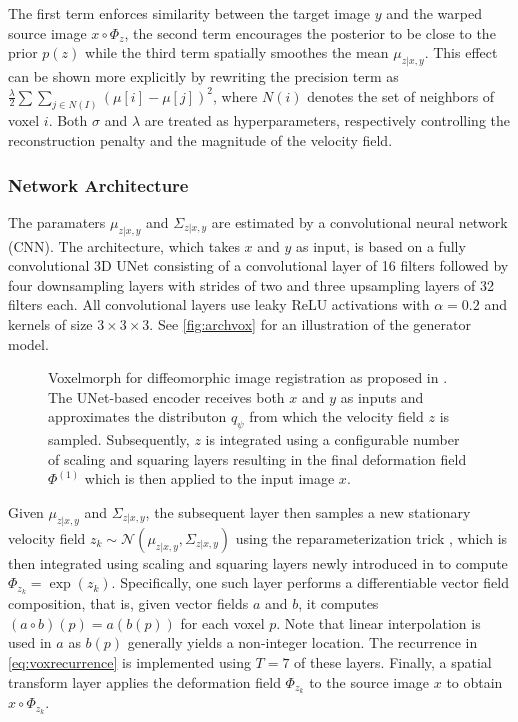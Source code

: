 The first term enforces similarity between the target image $y$ and the warped source image $x \circ \Phi_z$, the second term encourages the posterior to be close to the prior $p(z)$ while the third term spatially smoothes the mean $\mu_{z | x, y}$. This effect can be shown more explicitly by rewriting the precision term as $ { \frac{\lambda}{2} \sum \sum_{j \in N(I)} ( \mu[i] - \mu[j])^{2} } $, where $N(i)$ denotes the set of neighbors of voxel $i$. Both $\sigma$ and $\lambda$ are treated as hyperparameters, respectively controlling the reconstruction penalty and the magnitude of the velocity field.

\subsubsection*{Network Architecture}
The paramaters $\mu_{z | x, y}$ and $\Sigma_{z | x, y}$ are estimated by a convolutional neural network (CNN). The architecture, which takes $x$ and $y$ as input, is based on a fully convolutional 3D UNet consisting of a convolutional layer of 16 filters followed by four downsampling layers with strides of two and three upsampling layers of 32 filters each. All convolutional layers use leaky ReLU activations with $\alpha = 0.2$ and kernels of size $3\times3\times3$. See \autoref{fig:archvox} for an illustration of the generator model.

\begin{figure}
	\centering
	
	\caption{Voxelmorph for diffeomorphic image registration as proposed in \cite{dalca2018unsupervised}. The UNet-based encoder receives both $x$ and $y$ as inputs and approximates the distributon $q_\psi$ from which the velocity field $z$ is sampled. Subsequently, $z$ is integrated using a configurable number of scaling and squaring layers resulting in the final deformation field $\Phi^{(1)}$ which is then applied to the input image $x$.}
	\label{fig:archvox}
\end{figure}

Given $\mu_{z | x, y}$ and $\Sigma_{z | x, y}$, the subsequent layer then samples a new stationary velocity field $ { z_k \sim \mathcal{N}(\mu_{z | x, y}, \Sigma_{z | x, y}) } $ using the reparameterization trick \cite{kingma2013auto}, which is then integrated using scaling and squaring layers newly introduced in \cite{dalca2018unsupervised} to compute $\Phi_{z_k} = \exp(z_k)$. Specifically, one such layer performs a differentiable vector field composition, that is, given vector fields $a$ and $b$, it computes $(a \circ b)(p) = a(b(p))$ for each voxel $p$. Note that linear interpolation is used in $a$ as $b(p)$ generally yields a non-integer location. The recurrence in \autoref{eq:voxrecurrence} is implemented using $T = 7$ of these layers. Finally, a spatial transform layer applies the deformation field $\Phi_{z_k}$ to the source image $x$ to obtain $x \circ \Phi_{z_k}$.

